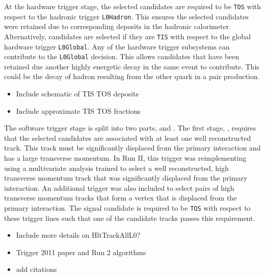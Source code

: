 At the hardware trigger stage, the selected candidates are required to be \texttt{TOS} with respect to the hadronic trigger \texttt{L0Hadron}. This ensures the selected candidates were retained due to corresponding deposits in the hadronic calorimeter. Alternatively, candidates are selected if they are \texttt{TIS} with respect to the global hardware trigger \texttt{L0Global}. Any of the hardware trigger subsystems can contribute to the \texttt{L0Global} decision. This allows candidates that have been retained due another highly energetic decay in the same event to contribute. This could be the decay of hadron resulting from the other \bquark quark in a \bquark\bquarkbar pair production. 

{\color{Green}
\begin{itemize}
\item Include schematic of TIS TOS deposits
\end{itemize}
}
{\color{Red}
\begin{itemize}
\item Include approximate TIS TOS fractions
\end{itemize}
}


The software trigger stage is split into two parts, \hltone and \hlttwo.
The first stage, \hltone, requires that the selected candidates are associated with at least one well reconstructed track. This track must be significantly displaced from the primary interaction and has a large transverse momentum. In Run II, this trigger was reimplementing using a multivariate analysis trained to select a well reconstructed, high transverse momentum track that was significantly displaced from the primary interaction. An additional trigger was also included to select pairs of high transverse momentum tracks that form a vertex that is displaced from the primary interaction. The signal candidate is required to be \texttt{TOS} with respect to these trigger lines such that one of the candidate tracks passes this requirement.   

{\color{Red}
\begin{itemize}
\item Include more details on HltTrackAllL0? 
\item Trigger 2011 paper and Run 2 algorithms
\item add citations
\end{itemize}
}



